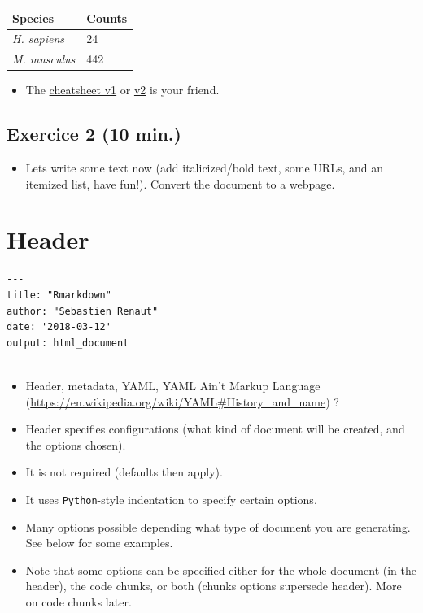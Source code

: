 \documentclass[]{article}
\providecommand{\tightlist}{%
  \setlength{\itemsep}{0pt}\setlength{\parskip}{0pt}}
\begin{document}
\begin{longtable}[]{@{}ll@{}}
\toprule
Species & Counts\tabularnewline
\midrule
\endhead
\emph{H. sapiens} & 24\tabularnewline
\emph{M. musculus} & 442\tabularnewline
\bottomrule
\end{longtable}

\begin{itemize}
\tightlist
\item
  The
  \href{https://www.rstudio.com/wp-content/uploads/2015/02/rmarkdown-cheatsheet.pdf}{cheatsheet
  v1} or
  \href{\%5Bcheatsheet\%20v1\%5D(https://www.rstudio.com/wp-content/uploads/2015/02/rmarkdown-cheatsheet.pdf)}{v2}
  is your friend.
\end{itemize}

\hypertarget{exercice-2-10-min.}{%
\subsection{Exercice 2 (10 min.)}\label{exercice-2-10-min.}}

\begin{itemize}
\tightlist
\item
  Lets write some text now (add italicized/bold text, some URLs, and an
  itemized list, have fun!). Convert the document to a webpage.
\end{itemize}

\hypertarget{header}{%
\section{Header}\label{header}}

\begin{verbatim}
---  
title: "Rmarkdown"  
author: "Sebastien Renaut"  
date: '2018-03-12'  
output: html_document  
---  
\end{verbatim}

\begin{itemize}
\item
  Header, metadata, YAML, YAML Ain't Markup Language
  (\url{https://en.wikipedia.org/wiki/YAML\#History_and_name}) ?
\item
  Header specifies configurations (what kind of document will be
  created, and the options chosen).
\item
  It is not required (defaults then apply).
\item
  It uses \texttt{Python}-style indentation to specify certain options.
\item
  Many options possible depending what type of document you are
  generating. See below for some examples.
\item
  Note that some options can be specified either for the whole document
  (in the header), the code chunks, or both (chunks options supersede
  header). More on code chunks later.
\end{itemize}
\end{document}
